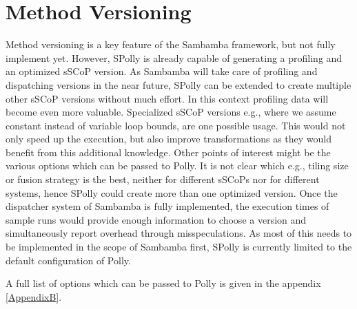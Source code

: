 \section{Method Versioning}
Method versioning is a key feature of the Sambamba framework, but 
not fully implement yet. However, SPolly is already capable of generating a 
profiling and an optimized sSCoP version. As Sambamba will take care of
profiling and dispatching versions in the near future, SPolly can be extended
to create multiple other sSCoP versions without much effort. In this context
profiling data will become even more valuable. Specialized sSCoP versions e.g.,
where we assume constant instead of variable loop bounds,  are one possible usage. 
This would not only 
speed up the execution, but also improve transformations as they would
benefit from this additional knowledge.
Other points of interest might be the various options which can be 
passed to Polly. 
It is not clear which e.g., tiling size or fusion strategy is the 
best, neither for different sSCoPs nor for different systems, hence SPolly could 
create more than one optimized version. 
Once the dispatcher system of Sambamba is fully implemented, the execution times
of sample runs would provide enough information to choose a version and simultaneously 
report overhead through misspeculations. As most of this needs to be implemented 
in the scope of Sambamba first, SPolly is currently limited to the default configuration
of Polly.

A full list of options which can be passed to Polly is given in the 
appendix \ref{AppendixB}.


